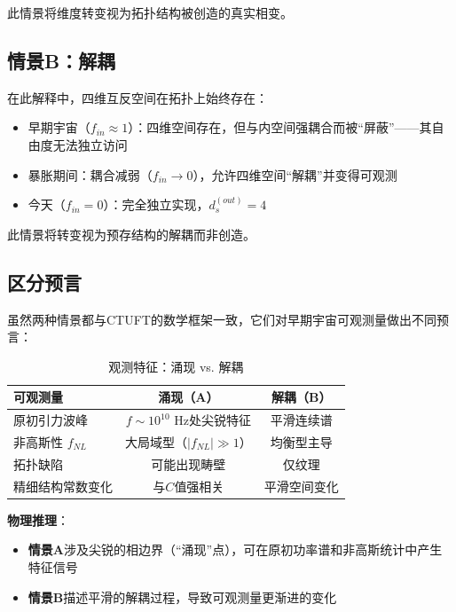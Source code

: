 此情景将维度转变视为拓扑结构被创造的真实相变。

\subsection{情景B：解耦}
\label{subsec:scenario-decoupling}

在此解释中，四维互反空间在拓扑上始终存在：
\begin{itemize}
    \item 早期宇宙（$f_{in} \approx 1$）：四维空间存在，但与内空间强耦合而被``屏蔽''——其自由度无法独立访问
    \item 暴胀期间：耦合减弱（$f_{in} \to 0$），允许四维空间``解耦''并变得可观测
    \item 今天（$f_{in} = 0$）：完全独立实现，$d_s^{(out)} = 4$
\end{itemize}

此情景将转变视为预存结构的解耦而非创造。

\subsection{区分预言}
\label{subsec:distinguishing-predictions}

虽然两种情景都与CTUFT的数学框架一致，它们对早期宇宙可观测量做出不同预言：

\begin{table}[htbp]
\centering
\caption{观测特征：涌现 vs. 解耦}
\label{tab:scenario-comparison}
\begin{tabular}{@{}lcc@{}}
\toprule
\textbf{可观测量} & \textbf{涌现（A）} & \textbf{解耦（B）} \\
\midrule
原初引力波峰 & $f \sim 10^{10}$ Hz处尖锐特征 & 平滑连续谱 \\
非高斯性 $f_{NL}$ & 大局域型（$|f_{NL}| \gg 1$） & 均衡型主导 \\
拓扑缺陷 & 可能出现畴壁 & 仅纹理 \\
精细结构常数变化 & 与$C$值强相关 & 平滑空间变化 \\
\bottomrule
\end{tabular}
\end{table}

\textbf{物理推理}：
\begin{itemize}
    \item \textbf{情景A}涉及尖锐的相边界（``涌现''点），可在原初功率谱和非高斯统计中产生特征信号
    \item \textbf{情景B}描述平滑的解耦过程，导致可观测量更渐进的变化
\end{itemize}

